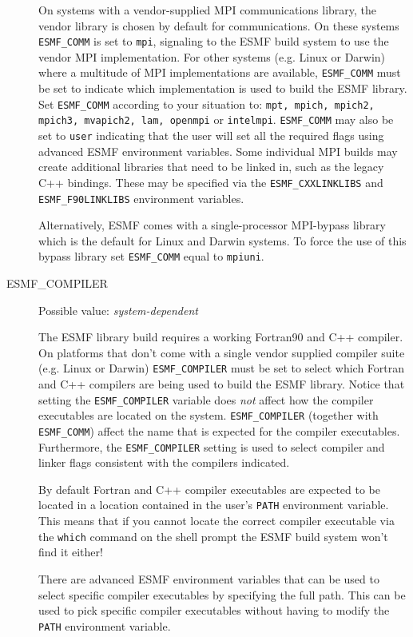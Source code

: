 \begin{description}
On systems with a vendor-supplied MPI communications library, the vendor library 
is chosen by default for communications. On these systems {\tt ESMF\_COMM} is
set to {\tt mpi}, signaling to the ESMF build system to use the vendor MPI
implementation.
For other systems (e.g. Linux or Darwin) where a multitude of MPI
implementations are available, {\tt ESMF\_COMM} must be set to indicate which
implementation is used to build the ESMF library. Set {\tt ESMF\_COMM} according
to your situation to: {\tt mpt, mpich, mpich2, mpich3, mvapich2, lam, openmpi}
or {\tt intelmpi}. {\tt ESMF\_COMM} may also be set to {\tt user} indicating 
that the user will set all the required flags using advanced ESMF environment
variables.  Some individual MPI builds may create additional libraries that 
need to be linked in, such as the legacy C++ bindings. These may be specified 
via the {\tt ESMF\_CXXLINKLIBS} and {\tt ESMF\_F90LINKLIBS} environment
variables.

Alternatively, ESMF comes with a single-processor MPI-bypass library which is
the default for Linux and Darwin systems. To force the use of this bypass
library set {\tt ESMF\_COMM} equal to {\tt mpiuni}.

\item[ESMF\_COMPILER]
Possible value: {\em system-dependent}

The ESMF library build requires a working Fortran90 and C++ compiler. On 
platforms that don't come with a single vendor supplied compiler suite
(e.g. Linux or Darwin) {\tt ESMF\_COMPILER} must be set to select which Fortran
and C++ compilers are being used to build the ESMF library. Notice that setting
the {\tt ESMF\_COMPILER} variable does {\em not} affect how the compiler
executables are located on the system. {\tt ESMF\_COMPILER} (together with
{\tt ESMF\_COMM}) affect the name that is expected for the compiler executables.
Furthermore, the {\tt ESMF\_COMPILER} setting is used to select compiler and
linker flags consistent with the compilers indicated.

By default Fortran and C++ compiler executables are expected to be located in
a location contained in the user's {\tt PATH} environment variable. This means
that if you cannot locate the correct compiler executable via the {\tt which}
command on the shell prompt the ESMF build system won't find it either!

There are advanced ESMF environment variables that can be used to select 
specific compiler executables by specifying the full path. This can be used to
pick specific compiler executables without having to modify the {\tt PATH}
environment variable.


\end{description}

